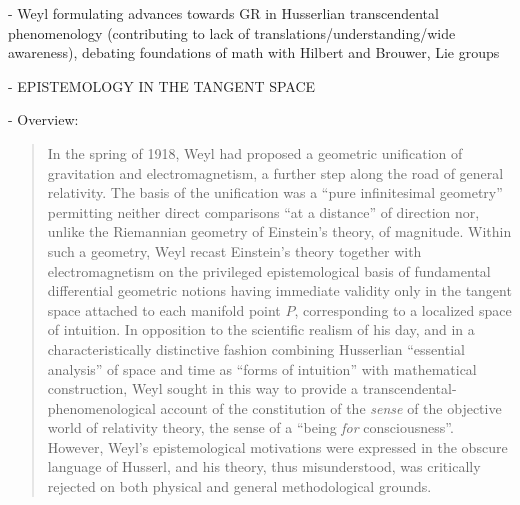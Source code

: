 - Weyl formulating advances towards GR in Husserlian transcendental phenomenology (contributing to lack of translations/understanding/wide awareness), debating foundations of math with Hilbert and Brouwer, Lie groups

- EPISTEMOLOGY IN THE TANGENT SPACE

- Overview:

\begin{quote}
    In the spring of 1918, Weyl had proposed a geometric unification of gravitation and electromagnetism, a further step along the road of general relativity.  The basis of the unification was a ``pure infinitesimal geometry'' permitting neither direct comparisons ``at a distance'' of direction nor, unlike the Riemannian geometry of Einstein's theory, of magnitude.  Within such a geometry, Weyl recast Einstein's theory together with electromagnetism on the privileged epistemological basis of fundamental differential geometric notions having immediate validity only in the tangent space attached to each manifold point $P$, corresponding to a localized space of intuition.  In opposition to the scientific realism of his day, and in a characteristically distinctive fashion combining Husserlian ``essential analysis'' of space and time as ``forms of intuition'' with mathematical construction, Weyl sought in this way to provide a transcendental-phenomenological account of the constitution of the \emph{sense} of the objective world of relativity theory, the sense of a ``being \emph{for} consciousness''.  However, Weyl's epistemological motivations were expressed in the obscure language of Husserl, and his theory, thus misunderstood, was critically rejected on both physical and general methodological grounds.
    

\end{quote}
